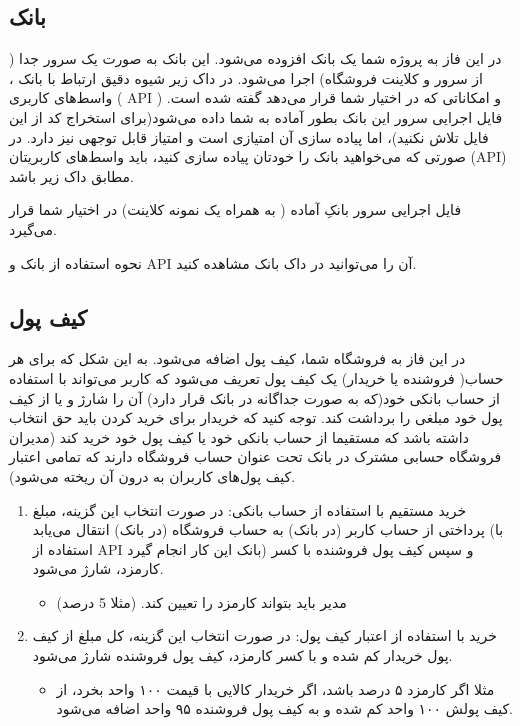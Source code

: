 \documentclass[]{article}
\begin{document}
\subsection*{{\titr بانک}}

در این فاز به پروژه شما یک بانک افزوده می‌شود. این بانک به صورت یک سرور جدا ( از سرور و کلاینت فروشگاه‌) اجرا می‌شود. در داک زیر شیوه دقیق ارتباط با بانک ، واسط‌های کاربری  ( API )‌ و امکاناتی که در اختیار شما قرار می‌دهد گفته شده است. فایل اجرایی سرور این بانک بطور آماده به شما داده می‌شود(برای استخراج کد از این فایل تلاش نکنید)، اما پیاده سازی آن امتیازی است و امتیاز قابل توجهی نیز دارد. در صورتی که می‌خواهید بانک را خودتان پیاده سازی کنید، باید واسط‌های کاربریتان (API)‌ مطابق داک زیر باشد.

فایل اجرایی سرور بانکِ آماده ( به همراه یک نمونه کلاینت) در اختیار شما قرار می‌گیرد.

نحوه استفاده از بانک و API آن را می‌توانید در \textcolor{CustomColor}{داک بانک} مشاهده کنید.

\newpage
\subsection*{{\titr کیف پول}}
در این فاز به \textcolor{CustomColor}{فروشگاه} شما، کیف پول اضافه می‌شود. به این شکل که برای هر حساب( فروشنده یا خریدار) یک کیف پول تعریف می‌شود که کاربر می‌تواند با استفاده از حساب بانکی خود(که به صورت جداگانه در بانک قرار دارد) آن را شارژ و یا از کیف پول خود مبلغی را برداشت کند. توجه کنید که خریدار برای خرید کردن باید حق انتخاب داشته باشد که مستقیما از حساب بانکی خود یا کیف پول خود خرید کند (مدیران فروشگاه حسابی مشترک در بانک تحت عنوان حساب فروشگاه دارند که تمامی اعتبار کیف پول‌های کاربران به درون آن ریخته می‌شود).


\begin{enumerate}

\item
خرید مستقیم با  استفاده از حساب بانکی: در صورت انتخاب این گزینه، مبلغ پرداختی از حساب کاربر (در بانک) به حساب فروشگاه (در بانک) انتقال می‌یابد (با استفاده از API بانک این کار انجام گیرد) و سپس کیف پول فروشنده با کسر کارمزد، شارژ‌ می‌شود.

\begin{itemize}[label=$\blacksquare$]
\item
مدیر باید بتواند کارمزد را تعیین کند. (مثلا 5 درصد)
\end{itemize}


\item
خرید با استفاده از اعتبار کیف پول:‌ در صورت انتخاب این گزینه، کل مبلغ از کیف پول خریدار کم شده و با کسر کارمزد، کیف پول فروشنده شارژ می‌شود.

\begin{itemize}[label=$\blacksquare$]
\item
مثلا اگر کارمزد ۵ درصد باشد، اگر خریدار کالایی با قیمت ۱۰۰ واحد بخرد، از کیف پولش ۱۰۰ واحد کم شده و به کیف پول فروشنده ۹۵ واحد اضافه می‌شود.
\end{itemize}

\end{enumerate}
\end{document}
